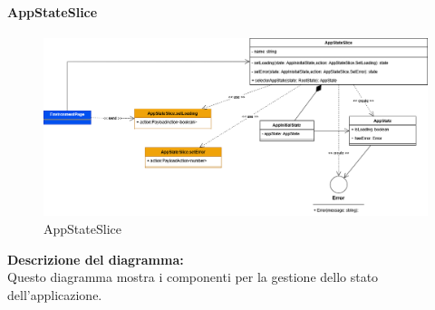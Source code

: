 \paragraph{AppStateSlice}
\begin{figure}[h!] \centering
    \includegraphics[scale=0.4]{template/images/uml_front/logic/appstateslice.png}
    \caption{AppStateSlice}
\end{figure}
\textbf{Descrizione del diagramma:}\\
Questo diagramma mostra i componenti per la gestione dello stato dell'applicazione.
